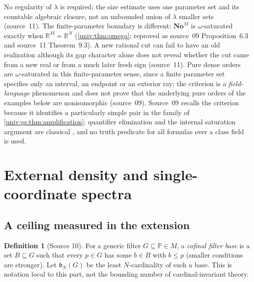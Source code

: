 \documentclass[11pt,letterpaper]{article}
\numberwithin{equation}{section}
\theoremstyle{definition}
\newtheorem{definition}[definition]{Definition}
\theoremstyle{remark}
\newcommand{\No}{\mathbf{No}}
\newcommand{\NoM}{\No^{M}}
\newcommand{\R}{\mathbb R}
\begin{document}
No regularity of $\lambda$ is required; the size estimate uses one parameter set
and its countable algebraic closure, not an unbounded union of $\lambda$ smaller
sets (source~11). The finite-parameter boundary is different: $\NoM$ is
$\omega$-saturated exactly when $\R^M=\R^N$ (\cref{univ:thm:omega}; reproved as
source~09 Proposition~6.3 and source~11 Theorem~9.3). A new rational cut can fail
to have an old realization although its gap character alone does not reveal
whether the cut came from a new real or from a much later fresh sign
(source~11). Pure dense orders are $\omega$-saturated in this finite-parameter
sense, since a finite parameter set specifies only an interval, an endpoint or an
exterior ray; the criterion is a \emph{field-language} phenomenon and does not
prove that the underlying pure orders of the examples below are nonisomorphic
(source~09). Source~09 recalls the criterion because it identifies a particularly
simple pair in the family of \cref{univ:gs:thm:amplification}; quantifier
elimination and the internal saturation argument are classical
\cite{EhrlichBSL,Marker}, and no truth predicate for all formulas over a class
field is used.

\section{External density and single-coordinate spectra}\label{univ:gs:sec:density}

\subsection{A ceiling measured in the extension}

\begin{definition}[Source 10]\label{univ:gs:def:filterbase}
For a generic filter $G\subseteq\mathbb P\in M$, a \emph{cofinal filter base} is a
set $B\subseteq G$ such that every $p\in G$ has some $b\in B$ with $b\le p$
(smaller conditions are stronger). Let $\mathfrak b_N(G)$ be the least
$N$-cardinality of such a base. This is notation local to this part, not the
bounding number of cardinal-invariant theory.
\end{definition}
\end{document}
